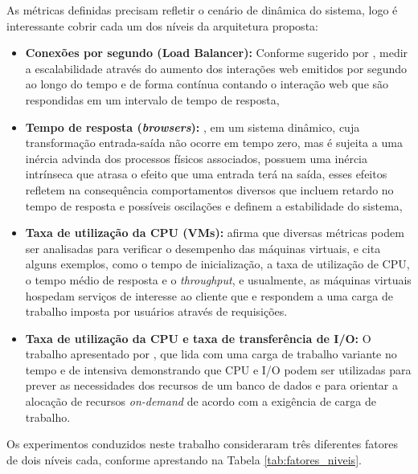 As métricas definidas precisam refletir o cenário de dinâmica do sistema, logo é interessante cobrir cada um dos níveis da arquitetura proposta:
\begin{itemize}
	\item \textbf{Conexões por segundo (Load Balancer):} Conforme sugerido por , medir a escalabilidade através do aumento dos interações web emitidos por segundo ao longo do tempo e de forma contínua contando o interação web que são respondidas em um intervalo de tempo de resposta,
	\item \textbf{Tempo de resposta (\textit{browsers}):} , em um sistema dinâmico, cuja transformação entrada-saída não ocorre em tempo zero, mas é sujeita a uma inércia advinda dos processos físicos associados, possuem uma inércia intrínseca que atrasa o efeito que uma entrada terá na saída, esses efeitos refletem na consequência comportamentos diversos que incluem retardo no tempo de resposta e possíveis oscilações e definem a estabilidade do sistema, 
	\item \textbf{Taxa de utilização da CPU (VMs):}  afirma que diversas métricas podem ser analisadas para verificar o desempenho das máquinas virtuais, e cita alguns exemplos, como o tempo de inicialização, a taxa de utilização de CPU, o tempo médio de resposta e o \textit{throughput}, e usualmente, as máquinas virtuais hospedam serviços de interesse ao cliente que e respondem a uma carga de trabalho imposta por usuários através de requisições.
	\item \textbf{Taxa de utilização da CPU e taxa de transferência de I/O:} O trabalho apresentado por , que lida com uma carga de trabalho variante no tempo e de intensiva demonstrando que CPU e I/O podem ser utilizadas para prever as necessidades dos recursos de um banco de dados e para orientar a alocação de recursos \textit{on-demand} de acordo com a exigência de carga de trabalho.
\end{itemize}


Os experimentos conduzidos neste trabalho consideraram três diferentes fatores de dois níveis cada, conforme aprestando na Tabela \ref{tab:fatores_niveis}. 

